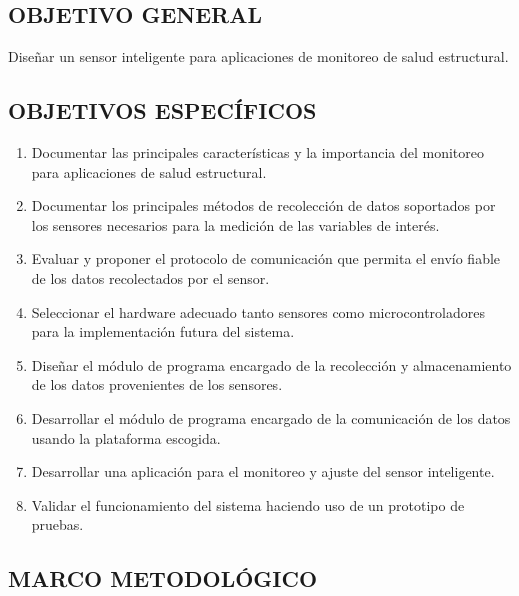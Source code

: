 \documentclass[12pt,letterpaper]{article}
\begin{document}
\subsection*{OBJETIVO GENERAL}

Diseñar un sensor inteligente para aplicaciones de monitoreo de salud estructural.

\subsection*{OBJETIVOS ESPECÍFICOS}


\begin{enumerate}[1.]


	\item Documentar las principales características y la importancia del monitoreo para aplicaciones de salud estructural.

	\item Documentar los principales métodos de recolección de datos soportados por los sensores necesarios para la medición de las variables de interés.

	\item Evaluar y proponer el protocolo de comunicación que permita el envío fiable de los datos recolectados por el sensor.

	\item Seleccionar el hardware adecuado tanto sensores como microcontroladores para la implementación futura del sistema.

	\item Diseñar el módulo de programa encargado de la recolección y almacenamiento de los datos provenientes de los sensores.

	\item Desarrollar el módulo de programa encargado de la comunicación de los datos usando la plataforma escogida.
	
	\item Desarrollar una aplicación para el monitoreo y ajuste del sensor inteligente.

	\item Validar el funcionamiento del sistema haciendo uso de un prototipo de pruebas.

\end{enumerate}
\newpage



\begin{center}

	\section*{MARCO METODOLÓGICO}

\end{center}
\end{document}
